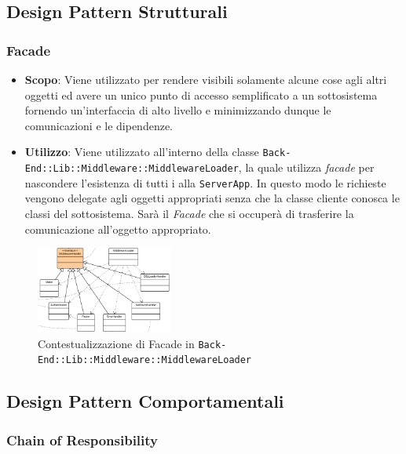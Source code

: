 \subsection{Design Pattern Strutturali}

\subsubsection{Facade}

\begin{itemize}

	\item \textbf{Scopo}: Viene utilizzato per rendere visibili solamente alcune cose agli altri oggetti ed avere un unico punto di accesso semplificato a un sottosistema fornendo un'interfaccia di alto livello e minimizzando dunque le comunicazioni e le dipendenze.
	\item \textbf{Utilizzo}: Viene utilizzato all'interno della classe \texttt{Back-End::Lib::Middleware::MiddlewareLoader}, la quale utilizza \textit{facade} per nascondere l'esistenza di tutti i  alla \texttt{ServerApp}. In questo modo le richieste vengono delegate agli oggetti appropriati senza che la classe cliente conosca le classi del sottosistema. Sarà il \textit{Facade} che si occuperà di trasferire la comunicazione all'oggetto appropriato.
\end{itemize}

\begin{figure}[H]
\centering \includegraphics[width=0.4\textwidth]{patterns/contestualizzazione/facade1.png}
\caption{Contestualizzazione di Facade in \texttt{Back-End::Lib::Middleware::MiddlewareLoader}}
\label{fig:mvc}
\end{figure}

\subsection{Design Pattern Comportamentali}

\subsubsection{Chain of Responsibility}
\label{chain-of-responsibility}

